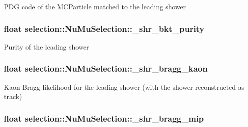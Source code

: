 P\-D\-G code of the M\-C\-Particle matched to the leading shower \hypertarget{classselection_1_1NuMuSelection_a6988cb9e869c0205f44659b3a65bd047}{
\subsubsection[{\-\_\-shr\-\_\-bkt\-\_\-purity}]{\setlength{\rightskip}{0pt plus 5cm}float selection\-::\-Nu\-Mu\-Selection\-::\-\_\-shr\-\_\-bkt\-\_\-purity\hspace{0.3cm}{\ttfamily [private]}}}\label{classselection_1_1NuMuSelection_a6988cb9e869c0205f44659b3a65bd047}
Purity of the leading shower \hypertarget{classselection_1_1NuMuSelection_a32142048875e97db40e44f0b4a51eae3}{
\subsubsection[{\-\_\-shr\-\_\-bragg\-\_\-kaon}]{\setlength{\rightskip}{0pt plus 5cm}float selection\-::\-Nu\-Mu\-Selection\-::\-\_\-shr\-\_\-bragg\-\_\-kaon\hspace{0.3cm}{\ttfamily [private]}}}\label{classselection_1_1NuMuSelection_a32142048875e97db40e44f0b4a51eae3}
Kaon Bragg likelihood for the leading shower (with the shower reconstructed as track) \hypertarget{classselection_1_1NuMuSelection_a418742070b70e6cd789a9dce1572c918}{
\subsubsection[{\-\_\-shr\-\_\-bragg\-\_\-mip}]{\setlength{\rightskip}{0pt plus 5cm}float selection\-::\-Nu\-Mu\-Selection\-::\-\_\-shr\-\_\-bragg\-\_\-mip\hspace{0.3cm}{\ttfamily [private]}}}\label{classselection_1_1NuMuSelection_a418742070b70e6cd789a9dce1572c918}
